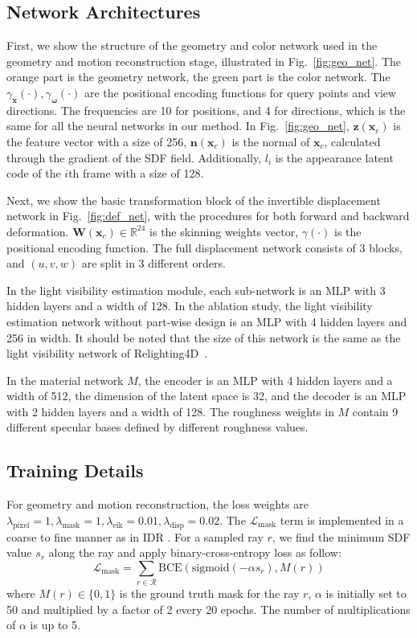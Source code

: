 \subsection{Network Architectures}

First, we show the structure of the geometry and color network used in the geometry and motion reconstruction stage, illustrated in Fig.~\ref{fig:geo_net}.
The orange part is the geometry network, the green part is the color network.
The $\gamma_\mathbf{x}(\cdot), \gamma_\mathbf{\omega}(\cdot)$ are the positional encoding functions for query points and view directions. 
The frequencies are 10 for positions, and 4 for directions, which is the same for all the neural networks in our method.
In Fig.~\ref{fig:geo_net}, $\mathbf{z}(\mathbf{x}_c)$ is the feature vector with a size of 256, $\mathbf{n}(\mathbf{x}_c)$ is the normal of $\mathbf{x}_c$, calculated through the gradient of the SDF field. Additionally, $l_i$ is the appearance latent code of the $i$th frame with a size of 128. 

Next, we show the basic transformation block of the invertible displacement network in Fig.~\ref{fig:def_net}, with the procedures for both forward and backward deformation. 
$\mathbf{W}(\mathbf{x}_c) \in \mathbb{R}^{24}$ is the skinning weights vector, $\gamma(\cdot)$ is the positional encoding function.
The full displacement network consists of 3 blocks, and $(u, v, w)$ are split in 3 different orders.

In the light visibility estimation module, each sub-network is an MLP with 3 hidden layers and a width of 128.
In the ablation study, the light visibility estimation network without part-wise design is an MLP with 4 hidden layers and 256 in width. It should be noted that the size of this network is the same as the light visibility network of Relighting4D~\cite{Relighting4D}.

In the material network $M$, the encoder is an MLP with 4 hidden layers and a width of 512, the dimension of the latent space is 32, and the decoder is an MLP with 2 hidden layers and a width of 128.
The roughness weights in $M$ contain 9 different specular bases defined by different roughness values. 

\subsection{Training Details}

For geometry and motion reconstruction, the loss weights are $\lambda_{\text{pixel}}=1, \lambda_{\text{mask}}=1, \lambda_{\text{eik}}=0.01, \lambda_{\text{disp}}=0.02$.
The $\mathcal{L}_{\text{mask}}$ term is implemented in a coarse to fine manner as in IDR \cite{idr}.
For a sampled ray $r$, we find the minimum SDF value $s_r$ along the ray and apply binary-cross-entropy loss as follow:
\begin{equation}
    \mathcal{L}_{\text{mask}} = \sum_{r\in \mathcal{R}} \text{BCE}\left(\text{sigmoid}(-\alpha s_r), M(r)\right)
\end{equation}
where $M(r) \in \{0, 1\}$ is the ground truth mask for the ray $r$, $\alpha$ is initially set to 50 and multiplied by a factor of 2 every 20 epochs. The number of multiplications of $\alpha$ is up to 5.

